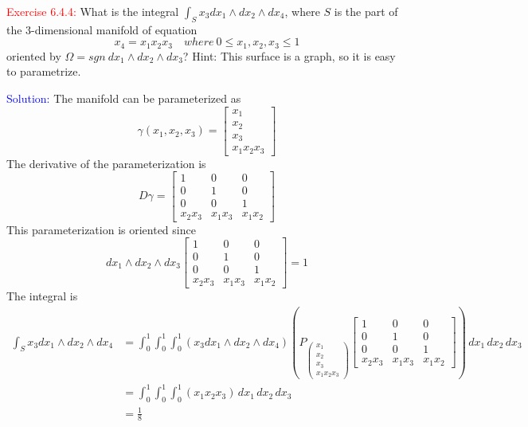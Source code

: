\documentclass[12pt]{article}
\begin{document}
\textcolor{red}{Exercise 6.4.4:}
What is the integral $\int_Sx_3dx_1\wedge dx_2\wedge dx_4$, where $S$ is the part of the $3$-dimensional manifold of equation
$$
x_4 = x_1x_2x_3\quad where\ 0\leq x_1,x_2,x_3\leq 1
$$
oriented by $\Omega = sgn\ dx_1\wedge dx_2\wedge dx_3$? Hint: This surface is a graph, so it is easy to parametrize.


\bigskip

\textcolor{blue}{Solution:}
    The manifold can be parameterized as 
    \[
        \gamma(x_1, x_2, x_3) =
        \begin{bmatrix}
            x_1 \\
            x_2 \\
            x_3 \\
            x_1x_2x_3
        \end{bmatrix}
    \]
    The derivative of the parameterization is 
    \[
        D\gamma = 
        \begin{bmatrix}
            1 & 0 & 0 \\
            0 & 1 & 0 \\
            0 & 0 & 1 \\
            x_2x_3 & x_1x_3 & x_1x_2
        \end{bmatrix}
    \]
    This parameterization is oriented since 
    \[
        dx_1\wedge dx_2\wedge dx_3 
        \begin{bmatrix}
            1 & 0 & 0 \\
            0 & 1 & 0 \\
            0 & 0 & 1 \\
            x_2x_3 & x_1x_3 & x_1x_2
        \end{bmatrix} = 1
    \]
    The integral is
    \begin{align*}
        \int_S x_3 dx_1\wedge dx_2\wedge dx_4
        &= \int_0^1 \int_0^1 \int_0^1 (x_3 dx_1\wedge dx_2\wedge dx_4)
            \left(
                P_{\begin{pmatrix} x_1 \\ x_2 \\ x_3 \\ x_1x_2x_3 \end{pmatrix}}
                \begin{bmatrix}
                    1 & 0 & 0 \\
                    0 & 1 & 0 \\
                    0 & 0 & 1 \\
                    x_2x_3 & x_1x_3 & x_1x_2
                \end{bmatrix}
            \right)
            \,dx_1 \,dx_2 \,dx_3 \\
        &= \int_0^1 \int_0^1 \int_0^1 (x_1x_2x_3) \,dx_1 \,dx_2 \,dx_3 \\
        &= \frac{1}{8}
    \end{align*} 
    
\end{document}
